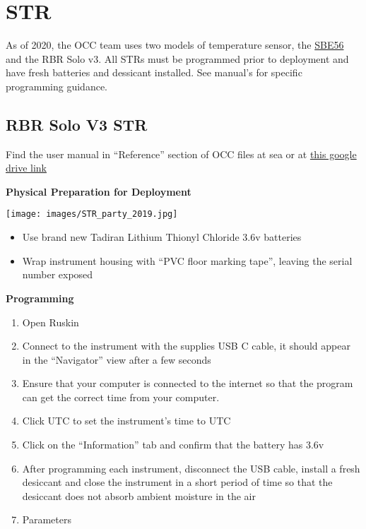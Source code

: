 \documentclass[]{book}
\begin{document}
\chapter{STR}\label{str}

As of 2020, the OCC team uses two models of temperature sensor, the
\protect\hyperlink{sbe56}{SBE56} and the RBR Solo v3. All STRs must be
programmed prior to deployment and have fresh batteries and dessicant
installed. See manual's for specific programming guidance.

\section{RBR Solo V3 STR}\label{rbr-solo-v3-str}

Find the user manual in ``Reference'' section of OCC files at sea or at
\href{https://drive.google.com/drive/folders/1U-g1gTLOArcf7o5yXx-76z2HU-ha1qCJ}{this
google drive link}

\textbf{Physical Preparation for Deployment}

\texttt{[image: images/STR\_party\_2019.jpg]}

\begin{itemize}
\item
  Use brand new Tadiran Lithium Thionyl Chloride 3.6v batteries
\item
  Wrap instrument housing with ``PVC floor marking tape'', leaving the
  serial number exposed
\end{itemize}

\textbf{Programming}

\begin{enumerate}
\def\labelenumi{\arabic{enumi}.}
\item
  Open Ruskin
\item
  Connect to the instrument with the supplies USB C cable, it should
  appear in the ``Navigator'' view after a few seconds
\item
  Ensure that your computer is connected to the internet so that the
  program can get the correct time from your computer.
\item
  Click UTC to set the instrument's time to UTC
\item
  Click on the ``Information'' tab and confirm that the battery has 3.6v
\item
  After programming each instrument, disconnect the USB cable, install a
  fresh desiccant and close the instrument in a short period of time so
  that the desiccant does not absorb ambient moisture in the air
\item
  Parameters
\end{enumerate}
\end{document}
